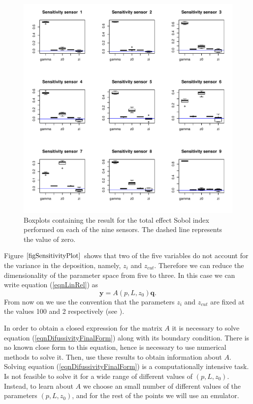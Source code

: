 \documentclass[12pt]{book}
\newcommand{\y}{\textbf{y}}
\begin{document}
\begin{figure}[H]
\centering
\includegraphics[scale=0.75]{./FigChap4/sensitivityPlot}
\caption{Boxplots containing the result  for the total effect Sobol index performed on each of the nine sensors.
The dashed line represents the value of zero.}
\label{figSensitivityPlot}
\end{figure}
Figure $\ref{figSensitivityPlot}$ shows that two of the five variables do not account for the variance 
in the deposition, namely, $z_{i}$ and $z_{cut}$. Therefore we can reduce the dimensionality of the parameter
space from five to three. In this case we can write equation (\ref{eqnLinRel}) as 
\begin{equation*}
\y=A(p,L,z_{0})\textbf{q}.
\end{equation*}  
From now on we use the convention that the parameters $z_{i}$ and $z_{cut}$ 
are  fixed at the values 100 and 2 respectively (see \cite{hosseini2016airborne}).  
\newline

In order to obtain a closed expression for the matrix $A$ it is necessary to solve 
equation (\ref{eqnDifussivityFinalForm}) along with its boundary condition. There is no known close
form to this equation, hence is necessary to use numerical methods to solve it. Then,
use these results to obtain information about $A$. Solving equation (\ref{eqnDifussivityFinalForm})
is a computationally intensive task. Is not feasible to solve it for a wide range
of different values of $(p,L,z_{0})$. Instead, to 
learn about $A$ we choose an small number of different values of the parameters $(p,L,z_{0})$, and
for the rest of the points we  will use an emulator.
\end{document}
